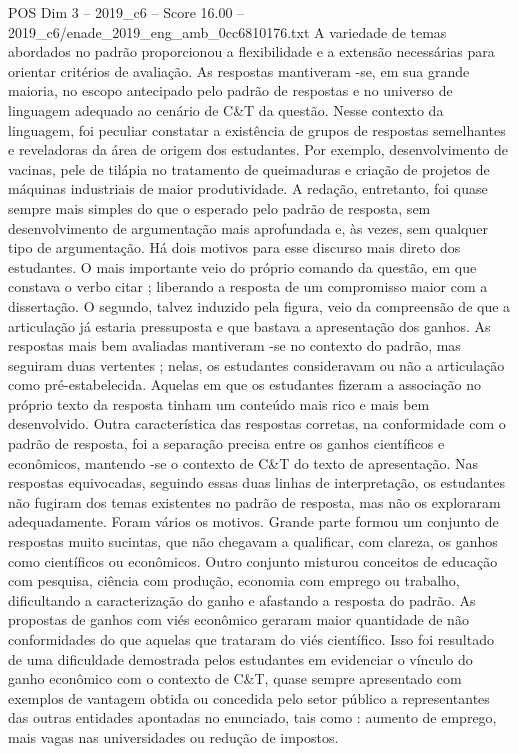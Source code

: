 \begin{textsample}{POS Dim 3 – 2019\_c6 – Score 16.00 – 2019\_c6/enade\_2019\_eng\_amb\_0cc6810176.txt}
A variedade de temas abordados no padrão proporcionou a flexibilidade e a extensão necessárias para orientar critérios de avaliação.
As respostas mantiveram -se, em sua grande maioria, no escopo antecipado pelo padrão de respostas e no universo de linguagem adequado ao cenário de C\&T da questão.
Nesse contexto da linguagem, foi peculiar constatar a existência de grupos de respostas semelhantes e reveladoras da área de origem dos estudantes.
Por exemplo, desenvolvimento de vacinas, pele de tilápia no tratamento de queimaduras e criação de projetos de máquinas industriais de maior produtividade.
A redação, entretanto, foi quase sempre mais simples do que o esperado pelo padrão de resposta, sem desenvolvimento de argumentação mais aprofundada e, às vezes, sem qualquer tipo de argumentação.
Há dois motivos para esse discurso mais direto dos estudantes.
O mais importante veio do próprio comando da questão, em que constava o verbo citar ; liberando a resposta de um compromisso maior com a dissertação.
O segundo, talvez induzido pela figura, veio da compreensão de que a articulação já estaria pressuposta e que bastava a apresentação dos ganhos.
As respostas mais bem avaliadas mantiveram -se no contexto do padrão, mas seguiram duas vertentes ; nelas, os estudantes consideravam ou não a articulação como pré-estabelecida.
Aquelas em que os estudantes fizeram a associação no próprio texto da resposta tinham um conteúdo mais rico e mais bem desenvolvido.
Outra característica das respostas corretas, na conformidade com o padrão de resposta, foi a separação precisa entre os ganhos científicos e econômicos, mantendo -se o contexto de C\&T do texto de apresentação.
Nas respostas equivocadas, seguindo essas duas linhas de interpretação, os estudantes não fugiram dos temas existentes no padrão de resposta, mas não os exploraram adequadamente.
Foram vários os motivos.
Grande parte formou um conjunto de respostas muito sucintas, que não chegavam a qualificar, com clareza, os ganhos como científicos ou econômicos.
Outro conjunto misturou conceitos de educação com pesquisa, ciência com produção, economia com emprego ou trabalho, dificultando a caracterização do ganho e afastando a resposta do padrão.
As propostas de ganhos com viés econômico geraram maior quantidade de não conformidades do que aquelas que trataram do viés científico.
Isso foi resultado de uma dificuldade demostrada pelos estudantes em evidenciar o vínculo do ganho econômico com o contexto de C\&T, quase sempre apresentado com exemplos de vantagem obtida ou concedida pelo setor público a representantes das outras entidades apontadas no enunciado, tais como : aumento de emprego, mais vagas nas universidades ou redução de impostos.

\end{textsample}
